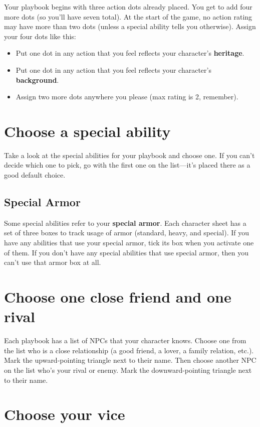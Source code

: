 \documentclass[11pt,fleqn,a5paper]{book}
\begin{document}
Your playbook begins with three action dots already placed. You get to add four more dots (so you’ll have seven total). At the start of the game, no action rating may have more than two dots (unless a special ability tells you otherwise). Assign your four dots like this:

\begin{itemize}
	\item Put one dot in any action that you feel reflects your character’s \textbf{heritage}.
	\item Put one dot in any action that you feel reflects your character’s \textbf{background}.
	\item Assign two more dots anywhere you please (max rating is 2, remember).
\end{itemize}

\section{Choose a special ability}

Take a look at the special abilities for your playbook and choose one. If you can’t decide which one to pick, go with the first one on the list---it’s placed there as a good default choice.

\subsection{Special Armor}

Some special abilities refer to your \textbf{special armor}. Each character sheet has a set of three boxes to track usage of armor (standard, heavy, and special). If you have any abilities that use your special armor, tick its box when you activate one of them. If you don’t have any special abilities that use special armor, then you can’t use that armor box at all.

\section{Choose one close friend and one rival}

Each playbook has a list of NPCs that your character knows. Choose one from the list who is a close relationship (a good friend, a lover, a family relation, etc.). Mark the upward-pointing triangle next to their name. Then choose another NPC on the list who’s your rival or enemy. Mark the downward-pointing triangle next to their name.

\section{Choose your vice}
\end{document}
